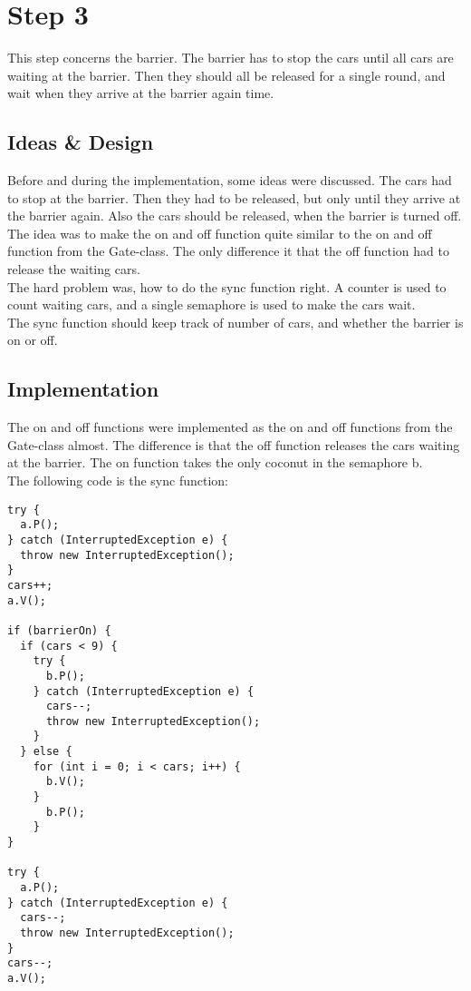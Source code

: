 \section{Step 3}
This step concerns the barrier. The barrier has to stop the cars until all cars are waiting at the barrier. Then they should all be released for a single round, and wait when they arrive at the barrier again time.

\subsection{Ideas \& Design}
Before and during the implementation, some ideas were discussed. The cars had to stop at the barrier. Then they had to be released, but only until they arrive at the barrier again. Also the cars should be released, when the barrier is turned off. \\
The idea was to make the on and off function quite similar to the on and off function from the Gate-class. The only difference it that the off function had to release the waiting cars.\\ 
The hard problem was, how to do the sync function right. A counter is used to count waiting cars, and a single semaphore is used to make the cars wait. \\
The sync function should keep track of number of cars, and whether the barrier is on or off.

\subsection{Implementation}
The on and off functions were implemented as the on and off functions from the Gate-class almost. The difference is that the off function releases the cars waiting at the barrier. The on function takes the only coconut in the semaphore b.\\

The following code is the sync function:
\begin{lstlisting}
try {
  a.P();
} catch (InterruptedException e) {
  throw new InterruptedException();
}
cars++;
a.V();

if (barrierOn) {
  if (cars < 9) {
    try {
      b.P();
    } catch (InterruptedException e) {
      cars--;
      throw new InterruptedException();
    }
  } else {
    for (int i = 0; i < cars; i++) {
      b.V();
    }
      b.P();
    }
}

try {
  a.P();
} catch (InterruptedException e) {
  cars--;
  throw new InterruptedException();
}
cars--;
a.V();
\end{lstlisting}
\vspace{.8cm}


